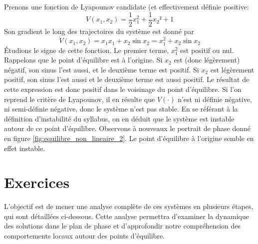             Prenons une fonction de Lyapounov candidate (et effectivement définie positive:
            \begin{equation}
                V(x_1, x_2) = \frac12 x_1^2 + \frac12 x_2² + 1
            \end{equation}
            Son gradient le long des trajectoires du système est donné par 
            \begin{equation}
                \dot V(x_1, x_2) = x_1x_1 + x_2\sin x_2 = x_1^2 + x_2\sin x_2
            \end{equation}
            Étudions le signe de cette fonction. Le premier terme, $x_1^2$ est positif ou nul. Rappelons que le point d'équilibre est à l'origine. Si $x_2$ est (donc légèrement) négatif, son sinus l'est aussi, et le deuxième terme est positif. Si $x_2$ est légèrement positif, son sinus l'est aussi et le deuxième terme est aussi positif. Le résultat de cette expression est donc positif dans le voisinage du point d'équilibre. Si l'on reprend le critère de Lyapounov, il en résulte que $V(\cdot)$ n'est ni définie négative, ni semi-définie négative, donc le système n'est pas stable. En se référant à la définition d'instabilité du syllabus, on en déduit que le système est instable autour de ce point d'équilibre. Observons à nouveaux le portrait de phase donné en figure \ref{fig:equilibre_non_lineaire_2}. Le point d'équilibre à l'origine semble en effet instable.
            
    \section{Exercices}
        L’objectif est de mener une analyse complète de ces systèmes en plusieurs étapes, qui sont détaillées ci-dessous. Cette analyse permettra d’examiner la dynamique des solutions dans le plan de phase et d’approfondir notre compréhension des comportements locaux autour des points d'équilibre.
    
